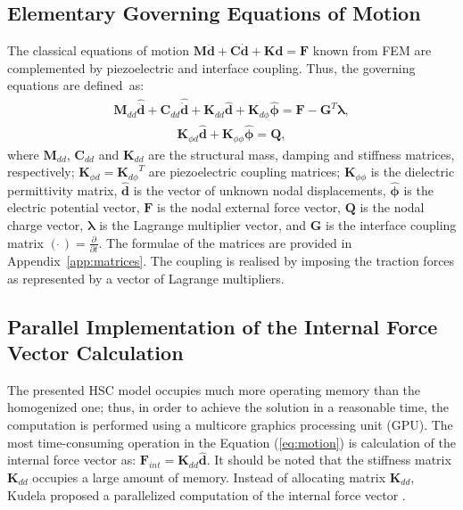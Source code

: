 \documentclass[sensors,article,accept,moreauthors,pdftex]{Definitions/mdpi}
\begin{document}
\begin{paracol}{2}
\subsection{Elementary Governing Equations of Motion}
\label{sec:motion}
The classical equations of motion \(\textbf{M}\ddot{\textbf{d}} + \textbf{C}\dot{\textbf{d}} + \textbf{K}\textbf{d} = \textbf{F}\) known from FEM are complemented by piezoelectric and interface coupling. Thus, the governing equations are defined~as:
\begin{eqnarray}
\textbf{M}_{dd} \widehat{\ddot{\textbf{d}}} + \textbf{C}_{dd} \widehat{\dot{\textbf{d}}} + \textbf{K}_{dd} \widehat{\textbf{d}} + \textbf{K}_{d\phi} \widehat{\boldsymbol{\phi}} = \textbf{F} - \textbf{G}^T \boldsymbol{\lambda},
\label{eq:motion}
\end{eqnarray}
\begin{eqnarray}
\textbf{K}_{\phi d}\widehat{\textbf{d}} + \textbf{K}_{\phi \phi} \widehat{\boldsymbol{\phi}} = \textbf{Q},
\label{eq:piezocoupling}
\end{eqnarray} 
where \(\textbf{M}_{dd}\), \(\textbf{C}_{dd}\) and \(\textbf{K}_{dd}\) are the structural mass, damping and stiffness matrices, respectively; \(\textbf{K}_{\phi d}={\textbf{K}_{d\phi}}^T\) are  piezoelectric coupling matrices; \(\textbf{K}_{\phi \phi}\) is the dielectric permittivity matrix, \(\widehat{\textbf{d}}\) is the vector of unknown nodal displacements,  \(\widehat{\boldsymbol{\phi}}\) is the electric potential vector, \(\textbf{F}\) is the nodal external force vector, \(\textbf{Q}\) is the nodal charge vector, \(\boldsymbol{\lambda}\) is the Lagrange multiplier vector, and \(\textbf{G}\) is the interface coupling matrix \((\dot{\ })=\frac{\partial}{\partial t}\).
The formulae of the matrices are provided in Appendix~\ref{app:matrices}.
The coupling is realised by imposing the traction forces as represented by a vector of Lagrange multipliers. 
\subsection{Parallel Implementation of the Internal Force Vector Calculation}
\label{sec:f_internal}
The presented HSC model occupies much more operating memory than the homogenized one; thus, in order to achieve the solution in a reasonable time, the computation is performed using a multicore graphics processing unit (GPU).  
The most time-consuming operation in the Equation (\ref{eq:motion}) is calculation of the internal force vector as: \(\textbf{F}_{int}=\textbf{K}_{dd} \widehat{\textbf{d}}\).
It should be noted that the stiffness matrix \(\textbf{K}_{dd}\) occupies a large amount of memory.
Instead of allocating matrix \(\textbf{K}_{dd}\), Kudela proposed a parallelized computation of the internal force vector \cite{kudela2016parallel}.



\end{paracol}
\end{document}
